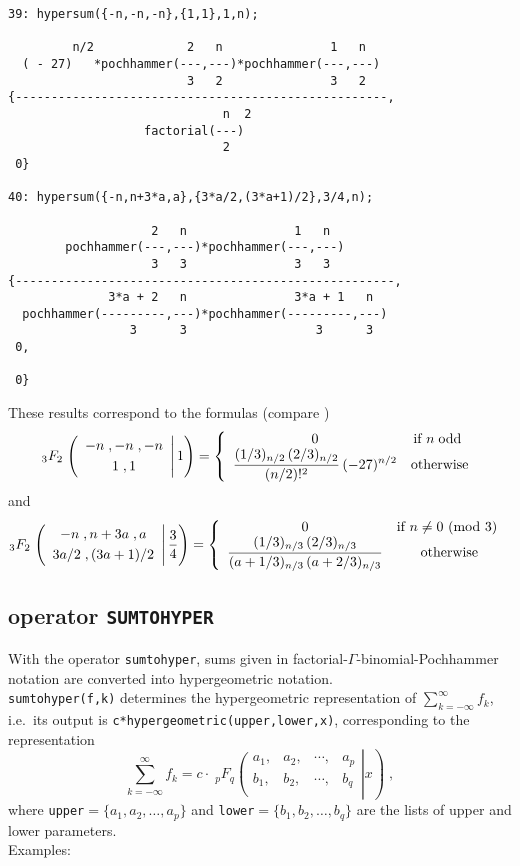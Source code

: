 {\small
\begin{verbatim}
39: hypersum({-n,-n,-n},{1,1},1,n);

         n/2             2   n               1   n
  ( - 27)   *pochhammer(---,---)*pochhammer(---,---)
                         3   2               3   2
{----------------------------------------------------,
                              n  2
                   factorial(---)
                              2
 0}

40: hypersum({-n,n+3*a,a},{3*a/2,(3*a+1)/2},3/4,n);

                    2   n               1   n
        pochhammer(---,---)*pochhammer(---,---)
                    3   3               3   3
{-----------------------------------------------------,
              3*a + 2   n               3*a + 1   n
  pochhammer(---------,---)*pochhammer(---------,---)
                 3      3                  3      3
 0,

 0}
\end{verbatim}
}\noindent
These results correspond to the formulas (compare \cite{Koepf:94b})
\[
_3 F_2\left.
\left(
\begin{array}{c}
-n\;, -n\;, -n\\[1mm]
1 \;, 1
\end{array}
\right| 1\right)
=
\left\{\begin{array}{cc} 0 & \mbox{\rm{if} $n\;\mbox{odd}$ } \\ \displaystyle
\frac{(1/3)_{n/2}\,(2/3)_{n/2}}{(n/2)!^2}\,(-27)^{n/2}
 & \mbox{\rm{otherwise}} \end{array}\right.
\]
and
\[
_3 F_2\left.
\left(
\begin{array}{c}
-n\;, n+3a\;, a\\[1mm]
3a/2\;,(3a+1)/2
\end{array}
\right| \frac{3}{4}\right)
=
\left\{\begin{array}{cc} 0 & \mbox{\rm{if} $n\neq 0 {\mbox{ (mod }} 3)$ } \\ \displaystyle
\frac{(1/3)_{n/3}\,(2/3)_{n/3}}
{(a+1/3)_{n/3}\,(a+2/3)_{n/3}}
 & \mbox{\rm{otherwise}} \end{array}\right.
\]

\subsection{\REDUCE{} operator {\tt SUMTOHYPER}}

With the operator {\tt sumtohyper}, sums given in
factorial-$\Gamma$-binomial-Poch\-hammer notation
are converted into hypergeometric notation.\\
\texttt{sumtohyper(f,k)} determines the hypergeometric representation
of
$\sum\limits_{k=-\infty}^\infty f_k$,
i.e.\
its output is {\tt c*hypergeometric(upper,lower,x)}, corresponding to
the representation
\[
\sum\limits_{k=-\infty}^\infty f_k=c\cdot\;
_{p}F_{q}\left.\left(\begin{array}{cccc}
a_{1},&a_{2},&\cdots,&a_{p}\\
b_{1},&b_{2},&\cdots,&b_{q}\\
            \end{array}\right| x\right)
\;,
\]
where {\tt upper}$=\{a_{1}, a_{2}, \ldots, a_{p}\}$
and {\tt lower}$=\{b_{1}, b_{2}, \ldots, b_{q}\}$
are the lists of upper and lower parameters.
\\
Examples:


